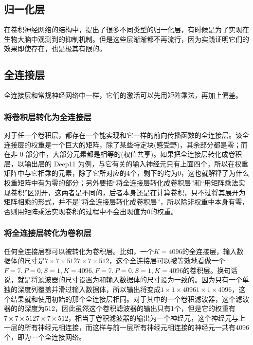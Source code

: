 \documentclass[UTF-8, a4paper, 12pt]{ctexart}
\begin{document}
\subsection{归一化层}
在卷积神经网络的结构中，提出了很多不同类型的归一化层，有时候是为了实现在生物大脑中观测到的抑制机制。但是这些层渐渐都不再流行，因为实践证明它们的效果即使存在，也是极其有限的。

\subsection{全连接层}
全连接层和常规神经网络中一样，它们的激活可以先用矩阵乘法，再加上偏差。

\subsubsection{将卷积层转化为全连接层}
对于任一个卷积层，都存在一个能实现和它一样的前向传播函数的全连接层。该全连接层的权重是一个巨大的矩阵，除了某些特定块(感受野)，其余部分都是零；而在非 0 部分中，大部分元素都是相等的(权值共享)。如果把全连接层转化成卷积层，以输出层的 Deep11 为例，与它有关的输入神经元只有上面四个，所以在权重矩阵中与它相乘的元素，除了它所对应的4个，剩下的均为0，这也就解释了为什么权重矩阵中有为零的部分；另外要把“将全连接层转化成卷积层”和“用矩阵乘法实现卷积”区别开，这两者是不同的，后者本身还是在计算卷积，只不过将其展开为矩阵相乘的形式，并不是”将全连接层转化成卷积层”，所以除非权重中本身有零，否则用矩阵乘法实现卷积的过程中不会出现值为0的权重。

\subsubsection{将全连接层转化为卷积层}
任何全连接层都可以被转化为卷积层。比如，一个$K=4096$的全连接层，输入数据体的尺寸是$ 7\times 7\times 5127\times 7\times 512$，这个全连接层可以被等效地看做一个$F=7,P=0,S=1,K=4096,F=7,P=0,S=1,K=4096$的卷积层。换句话说，就是将滤波器的尺寸设置为和输入数据体的尺寸设为一致的。因为只有一个单独的深度列覆盖并滑过输入数据体，所以输出将变成$1\times 1\times 40961\times 1\times 4096$，这个结果就和使用初始的那个全连接层相同。对于其中的一个卷积滤波器，这个滤波器的的深度为512，因此虽然这个卷积滤波器的输出只有1个，但是它的权重有$7\times 7\times 5127\times 7\times 512$，相当于卷积滤波器的输出为一个神经元，这个神经元与上一层的所有神经元相连接，而这样与前一层所有神经元相连接的神经元一共有4096个，即为一个全连接网络。
\end{document}
